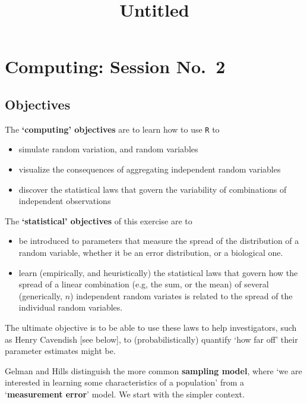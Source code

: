 \documentclass[
]{article}
\title{Untitled}
\author{}
\date{\vspace{-2.5em}}
\begin{document}
\maketitle

\hypertarget{computing02}{%
\section{Computing: Session No.~2}\label{computing02}}

\hypertarget{objectives}{%
\subsection{Objectives}\label{objectives}}

The \textbf{`computing' objectives} are to learn how to use \texttt{R}
to

\begin{itemize}
\item
  simulate random variation, and random variables
\item
  visualize the consequences of aggregating independent random
  variables\\
\item
  discover the statistical laws that govern the variability of
  combinations of independent observations
\end{itemize}

The \textbf{`statistical' objectives} of this exercise are to

\begin{itemize}
\item
  be introduced to parameters that measure the spread of the
  distribution of a random variable, whether it be an error
  distribution, or a biological one.
\item
  learn (empirically, and heuristically) the statistical laws that
  govern how the spread of a linear combination (e.g, the sum, or the
  mean) of several (generically, \(n\)) independent random variates is
  related to the spread of the individual random variables.
\end{itemize}

The ultimate objective is to be able to use these laws to help
investigators, such as Henry Cavendish {[}see below{]}, to
(probabilistically) quantify `how far off' their parameter estimates
might be.

Gelman and Hills distinguish the more common \textbf{sampling model},
where `we are interested in learning some characteristics of a
population' from a `\textbf{measurement error}' model. We start with the
simpler context.
\end{document}
